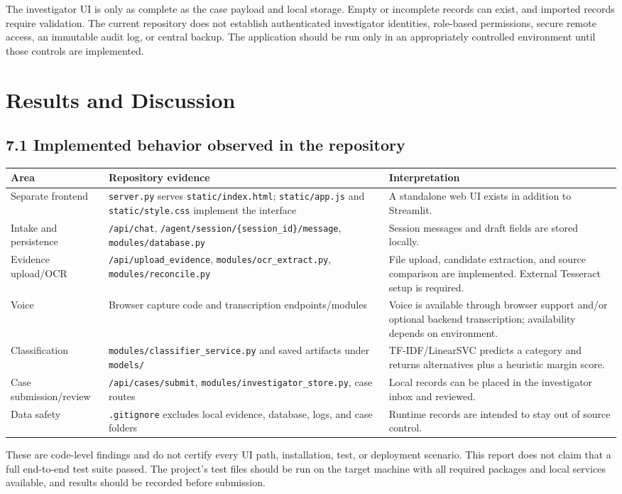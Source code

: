 \documentclass[12pt,a4paper,oneside]{report}
\begin{document}
The investigator UI is only as complete as the case payload and local storage. Empty or incomplete records can exist, and imported records require validation. The current repository does not establish authenticated investigator identities, role-based permissions, secure remote access, an immutable audit log, or central backup. The application should be run only in an appropriately controlled environment until those controls are implemented.

\clearpage\chapter{Results and Discussion}
\section{7.1 Implemented behavior observed in the repository}
\begin{longtable}{p{}p{}p{}}
\toprule
\textbf{Area} & \textbf{Repository evidence} & \textbf{Interpretation} \\
\midrule
Separate frontend & \texttt{server.py} serves \texttt{static/index.html}; \texttt{static/app.js} and \texttt{static/style.css} implement the interface & A standalone web UI exists in addition to Streamlit. \\
Intake and persistence & \texttt{/api/chat}, \texttt{/agent/session/\{session\_id\}/message}, \texttt{modules/database.py} & Session messages and draft fields are stored locally. \\
Evidence upload/OCR & \texttt{/api/upload\_evidence}, \texttt{modules/ocr\_extract.py}, \texttt{modules/reconcile.py} & File upload, candidate extraction, and source comparison are implemented. External Tesseract setup is required. \\
Voice & Browser capture code and transcription endpoints/modules & Voice is available through browser support and/or optional backend transcription; availability depends on environment. \\
Classification & \texttt{modules/classifier\_service.py} and saved artifacts under \texttt{models/} & TF-IDF/LinearSVC predicts a category and returns alternatives plus a heuristic margin score. \\
Case submission/review & \texttt{/api/cases/submit}, \texttt{modules/investigator\_store.py}, case routes & Local records can be placed in the investigator inbox and reviewed. \\
Data safety & \texttt{.gitignore} excludes local evidence, database, logs, and case folders & Runtime records are intended to stay out of source control. \\
\bottomrule
\end{longtable}
These are code-level findings and do not certify every UI path, installation, test, or deployment scenario. This report does not claim that a full end-to-end test suite passed. The project's test files should be run on the target machine with all required packages and local services available, and results should be recorded before submission.
\end{document}
